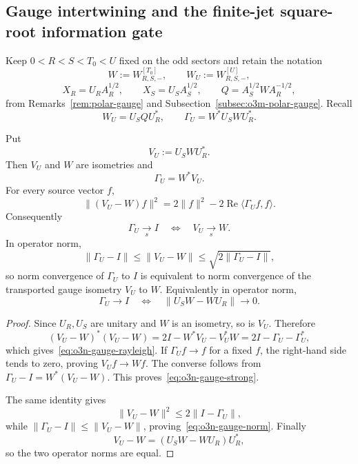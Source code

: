 
\subsection{Gauge intertwining and the finite-jet square-root information gate}
\label{subsec:o3n-gauge-intertwining}

Keep $0<R<S<T_0<U$ fixed on the odd sectors and retain the notation
\[
 W:=W_{R,S,-}^{[T_0]},\qquad
 W_U:=W_{R,S,-}^{[U]},
\]
\[
 X_R=U_RA_R^{1/2},\qquad X_S=U_SA_S^{1/2},
\qquad
 Q=A_S^{1/2}WA_R^{-1/2},
\]
from Remarks~\ref{rem:polar-gauge} and Subsection~\ref{subsec:o3m-polar-gauge}.  Recall
\[
 W_U=U_SQU_R^*,
 \qquad
 \Gamma_U=W^*U_SWU_R^*.
\]

\begin{proposition}\label{prop:o3n-gauge-criterion}
Put
\[
 V_U:=U_SWU_R^*.
\]
Then $V_U$ and $W$ are isometries and
\[
 \Gamma_U=W^*V_U.
\]
For every source vector $f$,
\[
 \boxed{
 \|(V_U-W)f\|^2
 =2\|f\|^2-2\operatorname{Re}\langle\Gamma_Uf,f\rangle.
 }
\tag{O3N.1}\label{eq:o3n-gauge-rayleigh}
\]
Consequently
\[
 \boxed{
 \Gamma_U\xrightarrow[s]{}I
 \quad\Longleftrightarrow\quad
 V_U\xrightarrow[s]{}W.
 }
\tag{O3N.2}\label{eq:o3n-gauge-strong}
\]
In operator norm,
\[
 \boxed{
 \|\Gamma_U-I\|
 \le \|V_U-W\|
 \le \sqrt{2\|\Gamma_U-I\|},
 }
\tag{O3N.3}\label{eq:o3n-gauge-norm}
\]
so norm convergence of $\Gamma_U$ to $I$ is equivalent to norm convergence of the
transported gauge isometry $V_U$ to $W$.  Equivalently in operator norm,
\[
 \boxed{
 \Gamma_U\to I
 \quad\Longleftrightarrow\quad
 \|U_SW-WU_R\|\to0.
 }
\tag{O3N.4}\label{eq:o3n-gauge-intertwining}
\]
\end{proposition}

\begin{proof}
Since $U_R,U_S$ are unitary and $W$ is an isometry, so is $V_U$.  Therefore
\[
 (V_U-W)^*(V_U-W)=2I-W^*V_U-V_U^*W
 =2I-\Gamma_U-\Gamma_U^*,
\]
which gives~\eqref{eq:o3n-gauge-rayleigh}.  If $\Gamma_Uf\to f$ for a fixed $f$, the
right-hand side tends to zero, proving $V_Uf\to Wf$.  The converse follows from
$\Gamma_U-I=W^*(V_U-W)$.  This proves~\eqref{eq:o3n-gauge-strong}.

The same identity gives
\[
 \|V_U-W\|^2
 \le 2\|I-\Gamma_U\|,
\]
while $\|\Gamma_U-I\|\le\|V_U-W\|$, proving~\eqref{eq:o3n-gauge-norm}.  Finally
\[
 V_U-W=(U_SW-WU_R)U_R^*,
\]
so the two operator norms are equal.
\end{proof}

